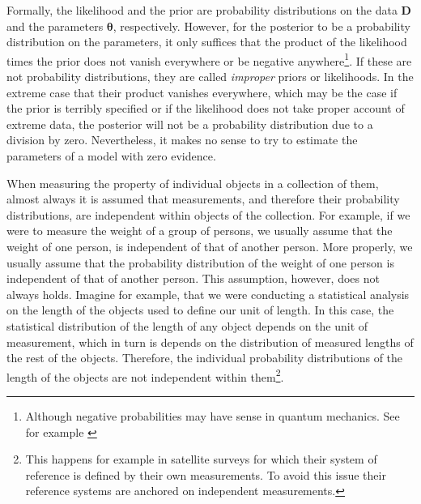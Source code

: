 Formally, the likelihood and the prior are probability distributions on the data $\mathbf{D}$ and the parameters $\mathbf{\theta}$, respectively. However, for the posterior to be a probability distribution on the parameters, it only suffices that the product of the likelihood times the prior does not vanish everywhere or be negative anywhere\footnote{Although negative probabilities may have sense in quantum mechanics. See for example \citet{1942RSPSA.180....1D}}. If these are not probability distributions, they are called \emph{improper} priors or likelihoods. In the extreme case that their product vanishes everywhere, which may be the case if the prior is terribly specified or if the likelihood does not take proper account of extreme data, the posterior will not be a probability distribution due to a division by zero. Nevertheless, it makes no sense to try to estimate the parameters of a model with zero evidence.

%

When measuring the property of individual objects in a collection of them, almost always it is assumed that measurements, and therefore their probability distributions, are independent within objects of the collection. For example, if we were to measure the weight of a group of persons, we usually assume that the weight of one person, is independent of that of another person. More properly, we usually assume that the probability distribution of the weight of one person is independent of that of another person. This assumption, however, does not always holds. Imagine for example, that we were conducting a statistical analysis on the length of the objects used to define our unit of length. In this case, the statistical distribution of the length of any object depends on the unit of measurement, which in turn is depends on the distribution of measured lengths of the rest of the objects. Therefore, the individual probability distributions of the length of the objects are not independent within them\footnote{This happens for example in satellite surveys for which their system of reference is defined by their own measurements. To avoid this issue their reference systems are anchored on independent measurements.}. 

